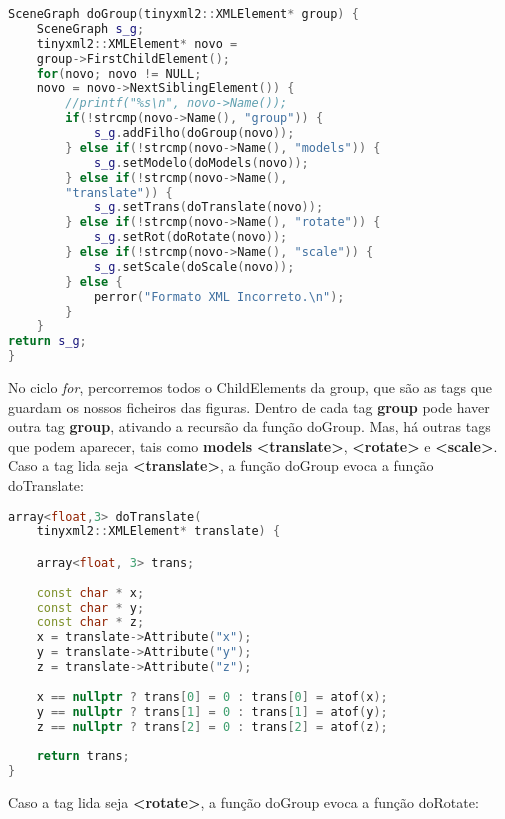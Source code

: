 \documentclass{article}
\begin{document}
\begin{file}
	\begin{lstlisting}[language=C++]
SceneGraph doGroup(tinyxml2::XMLElement* group) {
    SceneGraph s_g;
    tinyxml2::XMLElement* novo = 
	group->FirstChildElement();
    for(novo; novo != NULL; 
	novo = novo->NextSiblingElement()) {
        //printf("%s\n", novo->Name());
        if(!strcmp(novo->Name(), "group")) {
            s_g.addFilho(doGroup(novo));
        } else if(!strcmp(novo->Name(), "models")) {
            s_g.setModelo(doModels(novo));
        } else if(!strcmp(novo->Name(), 
		"translate")) {
            s_g.setTrans(doTranslate(novo));
        } else if(!strcmp(novo->Name(), "rotate")) {
            s_g.setRot(doRotate(novo));
        } else if(!strcmp(novo->Name(), "scale")) {
            s_g.setScale(doScale(novo));
        } else {
            perror("Formato XML Incorreto.\n");
        }
    }
return s_g;
}
	\end{lstlisting}
\end{file}

No ciclo \textit{for}, percorremos todos o ChildElements da group, que são as tags que guardam os nossos ficheiros das figuras.
Dentro de cada tag \textbf{group} pode haver outra tag \textbf{group}, ativando a recursão da função doGroup. Mas, há outras tags que podem aparecer, tais como \textbf{models} \textbf{<translate>}, \textbf{<rotate>} e \textbf{<scale>}.
Caso a tag lida seja \textbf{<translate>}, a função doGroup evoca a função doTranslate:

\begin{file}
	\begin{lstlisting}[language=C++]
array<float,3> doTranslate(
	tinyxml2::XMLElement* translate) {

    array<float, 3> trans;
    
    const char * x;
    const char * y;
    const char * z;
    x = translate->Attribute("x");
    y = translate->Attribute("y");
    z = translate->Attribute("z");
    
    x == nullptr ? trans[0] = 0 : trans[0] = atof(x);
    y == nullptr ? trans[1] = 0 : trans[1] = atof(y);
    z == nullptr ? trans[2] = 0 : trans[2] = atof(z);
    
    return trans;
}
	\end{lstlisting}
\end{file}

Caso a tag lida seja \textbf{<rotate>}, a função doGroup evoca a função doRotate:
\end{document}
